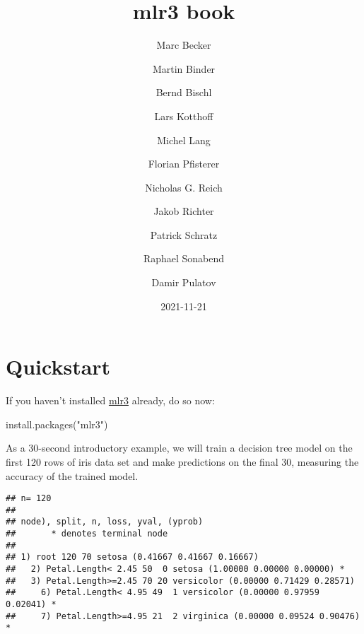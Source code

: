 \documentclass[
]{scrbook}
\title{mlr3 book}
\author{Marc Becker \and Martin Binder \and Bernd Bischl \and Lars Kotthoff \and Michel Lang \and Florian Pfisterer \and Nicholas G. Reich \and Jakob Richter \and Patrick Schratz \and Raphael Sonabend \and Damir Pulatov}
\date{2021-11-21}
\newenvironment{Shaded}{\begin{snugshade}}{\end{snugshade}}
\newcommand{\AttributeTok}[1]{\textcolor[rgb]{0.77,0.63,0.00}{#1}}
\newcommand{\CommentTok}[1]{\textcolor[rgb]{0.56,0.35,0.01}{\textit{#1}}}
\newcommand{\DecValTok}[1]{\textcolor[rgb]{0.00,0.00,0.81}{#1}}
\newcommand{\FunctionTok}[1]{\textcolor[rgb]{0.00,0.00,0.00}{#1}}
\newcommand{\NormalTok}[1]{#1}
\newcommand{\OtherTok}[1]{\textcolor[rgb]{0.56,0.35,0.01}{#1}}
\newcommand{\SpecialCharTok}[1]{\textcolor[rgb]{0.00,0.00,0.00}{#1}}
\newcommand{\StringTok}[1]{\textcolor[rgb]{0.31,0.60,0.02}{#1}}
\renewenvironment{Shaded} {\begin{snugshade}\small} {\end{snugshade}}
\begin{document}
\maketitle

{
\hypersetup{linkcolor=}
\setcounter{tocdepth}{1}
\tableofcontents
}
\hypertarget{quickstart}{%
\chapter*{Quickstart}\label{quickstart}}

If you haven't installed \href{https://mlr3.mlr-org.com}{mlr3} already, do so now:

\begin{Shaded}
\begin{Highlighting}[]
\FunctionTok{install.packages}\NormalTok{(}\StringTok{"mlr3"}\NormalTok{)}
\end{Highlighting}
\end{Shaded}

As a 30-second introductory example, we will train a decision tree model on the first 120 rows of iris data set and make predictions on the final 30, measuring the accuracy of the trained model.

\begin{Shaded}
\end{Shaded}

\begin{verbatim}
## n= 120 
## 
## node), split, n, loss, yval, (yprob)
##       * denotes terminal node
## 
## 1) root 120 70 setosa (0.41667 0.41667 0.16667)  
##   2) Petal.Length< 2.45 50  0 setosa (1.00000 0.00000 0.00000) *
##   3) Petal.Length>=2.45 70 20 versicolor (0.00000 0.71429 0.28571)  
##     6) Petal.Length< 4.95 49  1 versicolor (0.00000 0.97959 0.02041) *
##     7) Petal.Length>=4.95 21  2 virginica (0.00000 0.09524 0.90476) *
\end{verbatim}
\end{document}
